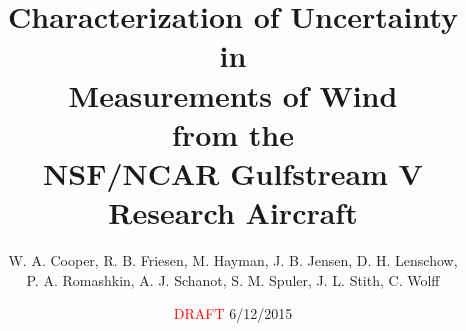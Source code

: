 \documentclass[12pt,twoside,english]{article}\usepackage[]{graphicx}\usepackage[]{color}
\begin{document}
\title{Characterization of Uncertainty \\
 in \\Measurements of Wind\\
 from the \\NSF/NCAR Gulfstream V Research Aircraft}


\author{W. A. Cooper, R. B. Friesen, M. Hayman, J. B. Jensen, D. H. Lenschow, \\P. A. Romashkin, A. J. Schanot, S. M. Spuler, J. L. Stith, C. Wolff}


\date{\textcolor{red}{DRAFT} 6/12/2015}
\thispagestyle{empty}
\maketitle
\vfill{}
\eject%
\end{document}
